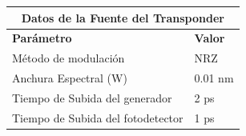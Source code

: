 	\begin{table}[h!]
	\centering
	\begin{tabular}{|l|l|}
	\hline
	\multicolumn{2}{|c|}{\textbf{Datos de la Fuente del Transponder}} \\ \hline
	\textbf{Parámetro}          & \textbf{Valor} \\ \hline
	Método de modulación        & NRZ            \\ \hline
	Anchura Espectral (W)       & 0.01 nm        \\ \hline
	Tiempo de Subida del generador & 2 ps          \\ \hline
	Tiempo de Subida del fotodetector & 1 ps       \\ \hline
	\end{tabular}
	\end{table}
\newpage
